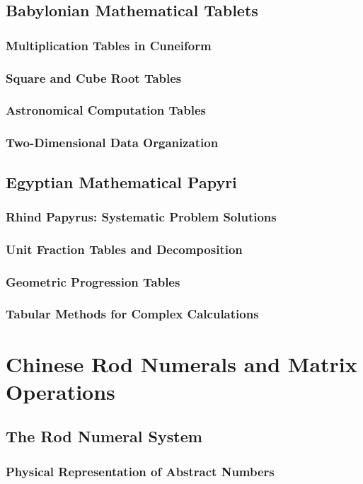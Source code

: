 \documentclass[12pt, oneside]{book}
\begin{document}
\subsection{Babylonian Mathematical Tablets}
\subsubsection{Multiplication Tables in Cuneiform}
\subsubsection{Square and Cube Root Tables}
\subsubsection{Astronomical Computation Tables}
\subsubsection{Two-Dimensional Data Organization}

\subsection{Egyptian Mathematical Papyri}
\subsubsection{Rhind Papyrus: Systematic Problem Solutions}
\subsubsection{Unit Fraction Tables and Decomposition}
\subsubsection{Geometric Progression Tables}
\subsubsection{Tabular Methods for Complex Calculations}

\section{Chinese Rod Numerals and Matrix Operations}
\subsection{The Rod Numeral System}
\subsubsection{Physical Representation of Abstract Numbers}
\end{document}
